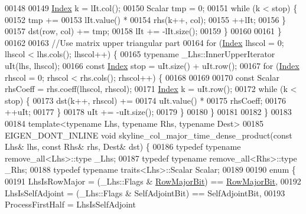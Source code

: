 \begin{DoxyCode}
00148 
00149             \hyperlink{namespace_eigen_a62e77e0933482dafde8fe197d9a2cfde}{Index} k = lIt.col();
00150             Scalar tmp = 0;
00151             \textcolor{keywordflow}{while} (k < stop) \{
00152                 tmp +=
00153                         lIt.value() *
00154                         rhs(k++, col);
00155                 ++lIt;
00156             \}
00157             dst(row, col) += tmp;
00158             lIt += -lIt.size();
00159         \}
00160 
00161     \}
00162 
00163     \textcolor{comment}{//Use matrix upper triangular part}
00164     \textcolor{keywordflow}{for} (\hyperlink{namespace_eigen_a62e77e0933482dafde8fe197d9a2cfde}{Index} lhscol = 0; lhscol < lhs.cols(); lhscol++) \{
00165         \textcolor{keyword}{typename} \_Lhs::InnerUpperIterator uIt(lhs, lhscol);
00166         \textcolor{keyword}{const} \hyperlink{namespace_eigen_a62e77e0933482dafde8fe197d9a2cfde}{Index} stop = uIt.size() + uIt.row();
00167         \textcolor{keywordflow}{for} (\hyperlink{namespace_eigen_a62e77e0933482dafde8fe197d9a2cfde}{Index} rhscol = 0; rhscol < rhs.cols(); rhscol++) \{
00168 
00169 
00170             \textcolor{keyword}{const} Scalar rhsCoeff = rhs.coeff(lhscol, rhscol);
00171             \hyperlink{namespace_eigen_a62e77e0933482dafde8fe197d9a2cfde}{Index} k = uIt.row();
00172             \textcolor{keywordflow}{while} (k < stop) \{
00173                 dst(k++, rhscol) +=
00174                         uIt.value() *
00175                         rhsCoeff;
00176                 ++uIt;
00177             \}
00178             uIt += -uIt.size();
00179         \}
00180     \}
00181 
00182 \}
00183 
00184 \textcolor{keyword}{template}<\textcolor{keyword}{typename} Lhs, \textcolor{keyword}{typename} Rhs, \textcolor{keyword}{typename} Dest>
00185 EIGEN\_DONT\_INLINE \textcolor{keywordtype}{void} skyline\_col\_major\_time\_dense\_product(\textcolor{keyword}{const} Lhs& lhs, \textcolor{keyword}{const} Rhs& rhs, Dest& dst) \{
00186     \textcolor{keyword}{typedef} \textcolor{keyword}{typename} remove\_all<Lhs>::type \_Lhs;
00187     \textcolor{keyword}{typedef} \textcolor{keyword}{typename} remove\_all<Rhs>::type \_Rhs;
00188     \textcolor{keyword}{typedef} \textcolor{keyword}{typename} traits<Lhs>::Scalar Scalar;
00189 
00190     \textcolor{keyword}{enum} \{
00191         LhsIsRowMajor = (\_Lhs::Flags & \hyperlink{group__flags_gae4f56c2a60bbe4bd2e44c5b19cbe8762}{RowMajorBit}) == \hyperlink{group__flags_gae4f56c2a60bbe4bd2e44c5b19cbe8762}{RowMajorBit},
00192         LhsIsSelfAdjoint = (\_Lhs::Flags & SelfAdjointBit) == SelfAdjointBit,
00193         ProcessFirstHalf = LhsIsSelfAdjoint

\end{DoxyCode}
